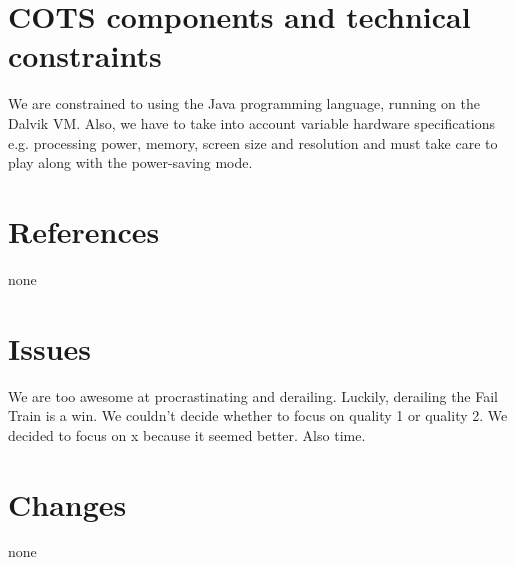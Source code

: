 \documentclass[12pt, a4paper]{article}
\begin{document}
\section{COTS components and technical constraints}

We are constrained to using the Java programming language, running on the Dalvik VM.
Also, we have to take into account variable hardware specifications e.g. processing power, memory, screen size and resolution and must take care to play along with the power-saving mode.

\section{References}
none

\section{Issues}
We are too awesome at procrastinating and derailing. Luckily, derailing the Fail Train is a win. 
	We couldn’t decide whether to focus on quality 1 or quality 2. We decided to focus on x because it seemed better. Also time.

\section{Changes}
none
\end{document}
